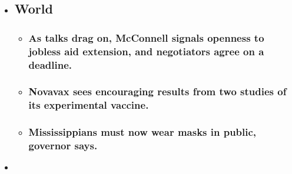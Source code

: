 \begin{itemize}
\item
  \href{https://www.nytimes3xbfgragh.onion/2020/08/04/world/coronavirus-cases.html?type=styln-live-updates\&label=world\&index=0}{}

  \hypertarget{world}{%
  \subsection{World}\label{world}}

  \begin{itemize}
  \item
    \href{https://www.nytimes3xbfgragh.onion/2020/08/04/world/coronavirus-cases.html?type=styln-live-updates\&label=world\&index=0\#link-762df92}{}

    \hypertarget{as-talks-drag-on-mcconnell-signals-openness-to-jobless-aid-extension-and-negotiators-agree-on-a-deadline}{%
    \subsubsection{As talks drag on, McConnell signals openness to
    jobless aid extension, and negotiators agree on a
    deadline.}\label{as-talks-drag-on-mcconnell-signals-openness-to-jobless-aid-extension-and-negotiators-agree-on-a-deadline}}
  \item
    \href{https://www.nytimes3xbfgragh.onion/2020/08/04/world/coronavirus-cases.html?type=styln-live-updates\&label=world\&index=0\#link-1228a480}{}

    \hypertarget{novavax-sees-encouraging-results-from-two-studies-of-its-experimental-vaccine}{%
    \subsubsection{Novavax sees encouraging results from two studies of
    its experimental
    vaccine.}\label{novavax-sees-encouraging-results-from-two-studies-of-its-experimental-vaccine}}
  \item
    \href{https://www.nytimes3xbfgragh.onion/2020/08/04/world/coronavirus-cases.html?type=styln-live-updates\&label=world\&index=0\#link-794484ed}{}

    \hypertarget{mississippians-must-now-wear-masks-in-public-governor-says}{%
    \subsubsection{Mississippians must now wear masks in public,
    governor
    says.}\label{mississippians-must-now-wear-masks-in-public-governor-says}}
  \end{itemize}
\item
  \href{https://www.nytimes3xbfgragh.onion/live/2020/08/04/business/stock-market-today-coronavirus?type=styln-live-updates\&label=business\&index=1}{}


\end{itemize}
